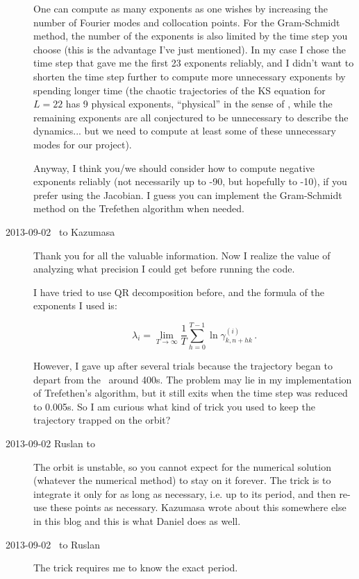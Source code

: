 \begin{description}
One can compute as many exponents as one wishes by increasing the number
 of Fourier modes and collocation points.
For the Gram-Schmidt method, the number of the exponents is also limited
 by the time step you choose (this is the advantage I've just mentioned).
In my case I chose the time step that gave me the first 23 exponents reliably,
 and I didn't want to shorten the time step further
 to compute more unnecessary exponents by spending longer time
 (the chaotic trajectories of the KS equation for $L=22$ has
 9 physical exponents,
 ``physical'' in the sense of ,
 while the remaining exponents are all conjectured to be
 unnecessary to describe the dynamics... but we need to compute
 at least some of these unnecessary modes for our project).

Anyway, I think you/we should consider
 how to compute negative exponents reliably
 (not necessarily up to -90, but hopefully to -10),
 if you prefer using the Jacobian.
I guess you can implement the Gram-Schmidt method
 on the Trefethen algorithm when needed.

 \item[2013-09-02 \XD\ to Kazumasa]
 Thank you for all the valuable information. Now I realize the value of
 analyzing what precision I could get before running the code.

 I have tried to
 use QR decomposition before, and
 the formula of the exponents I used is:

 \[
 \lambda_i=\lim_{T\to \infty} \frac{1}{T} \sum_{h=0}^{T-1}
  \ln\gamma_{k,n+hk}^{(i)}
 \,.
\]

However, I gave up after several trials because the trajectory began to
depart from the \po\ around 400s.
The problem may lie in my implementation of
Trefethen's algorithm, but it still exits when the time
step was reduced to 0.005s. So I am curious what kind of trick you used to keep the trajectory
trapped on the orbit?

\item[2013-09-02 Ruslan to \XD] The orbit is unstable, so you cannot expect
for the numerical solution (whatever the numerical method) to stay on it forever.
The trick is to integrate it only for as long as necessary, i.e. up to its period,
and then re-use these points as necessary.
Kazumasa wrote about this somewhere else in
this blog and this is what Daniel does as well.

\item[2013-09-02 \XD\ to Ruslan]
The trick requires me to know the exact period.


\end{description}

